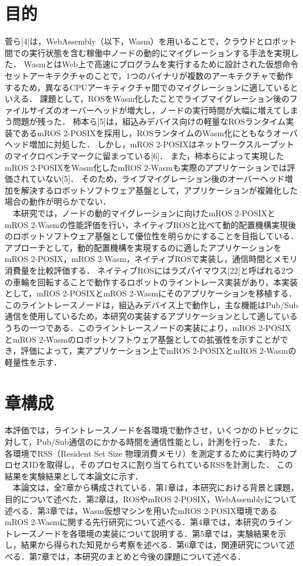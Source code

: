 \section{目的}
菅ら[4]は，WebAssembly（以下，Wasm）を用いることで，クラウドとロボット間での実行状態を含む稼働中ノードの動的にマイグレーションする手法を実現した．
WasmとはWeb上で高速にプログラムを実行するために設計された仮想命令セットアーキテクチャのことで，1つのバイナリが複数のアーキテクチャで動作するため，異なるCPUアーキティクチャ間でのマイグレーションに適しているといえる．
課題として，ROSをWasm化したことでライブマイグレーション後のファイルサイズのオーバーヘッドが増大し，ノードの実行時間が大幅に増えてしまう問題が残った．
柿本ら[5]は，組込みデバイス向けの軽量なROSランタイム実装であるmROS 2-POSIXを採用し，ROSランタイムのWasm化にともなうオーバヘッド増加に対処した．
しかし，mROS 2-POSIXはネットワークスループットのマイクロベンチマークに留まっている[6]．
また，柿本らによって実現したmROS 2-POSIXをWasm化したmROS 2-Wasmも実際のアプリケーションでは評価されていない[5]．
そのため，ライブマイグレーション後のオーバーヘッド増加を解決するロボットソフトウェア基盤として，アプリケーションが複雑化した場合の動作が明らかでない．
\\　本研究では，ノードの動的マイグレーションに向けたmROS 2-POSIXとmROS 2-Wasmの性能評価を行い，ネイティブROSと比べて動的配置機構実現後のロボットソフトウェア基盤として優位性を明らかにすることを目指している．
アプローチとして，動的配置機構を実現するのに適したアプリケーションをmROS 2-POSIX，mROS 2-Wasm，ネイティブROSで実装し，通信時間とメモリ消費量を比較評価する．
ネイティブROSにはラズパイマウス[22]と呼ばれる2つの車輪を回転することで動作するロボットのライントレース実装があり，本実装として，mROS 2-POSIXとmROS 2-Wasmにそのアプリケーションを移植する．
このライントレースノードは，組込みデバイス上で動作し，主な機能はPub/Sub通信を使用しているため，本研究の実装するアプリケーションとして適しているうちの一つである．このライントレースノードの実装により，mROS 2-POSIXとmROS 2-Wasmのロボットソフトウェア基盤としての拡張性を示すことができ，評価によって，実アプリケーション上でmROS 2-POSIXとmROS 2-Wasmの軽量性を示す．
\section{章構成}
本評価では，ライントレースノードを各環境で動作させ，いくつかのトピックに対して，Pub/Sub通信のにかかる時間を通信性能とし，計測を行った．
また，各環境でRSS（Resident Set Size 物理消費メモリ）を測定するために実行時のプロセスIDを取得し，そのプロセスに割り当てられているRSSを計測した．
この結果を実験結果として本論文に示す．
\\　本論文は，全7章から構成されている．第1章は，本研究における背景と課題，目的について述べた．第2章は，ROSやmROS 2-POSIX，WebAssemblyについて述べる．第3章では，Wasm仮想マシンを用いたmROS 2-POSIX環境であるmROS 2-Wasmに関する先行研究について述べる．第4章では，本研究のライントレースノードを各環境の実装について説明する．第5章では，実験結果を示し，結果から得られた知見から考察を述べる．第6章では，関連研究について述べる．第7章では，本研究のまとめと今後の課題について述べる．
